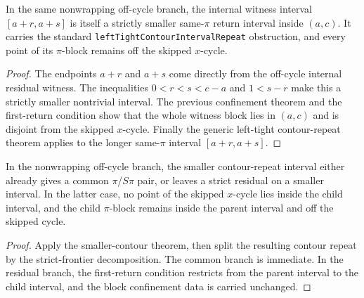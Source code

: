 \begin{theorem}
  \label{thm:off-cycle-smaller-contour-interval}
  \leanok
  In the same nonwrapping off-cycle branch, the internal witness interval
  \([a+r,a+s]\) is itself a strictly smaller same-\(\pi\) return interval
  inside \((a,c)\).  It carries the standard
  \texttt{leftTightContourIntervalRepeat} obstruction, and every point of its
  \(\pi\)-block remains off the skipped \(x\)-cycle.
\end{theorem}

\begin{proof}
  \leanok
  The endpoints \(a+r\) and \(a+s\) come directly from the off-cycle internal
  residual witness.  The inequalities \(0<r<s<c-a\) and \(1<s-r\) make this a
  strictly smaller nontrivial interval.  The previous confinement theorem and
  the first-return condition show that the whole witness block lies in
  \((a,c)\) and is disjoint from the skipped \(x\)-cycle.  Finally the generic
  left-tight contour-repeat theorem applies to the longer same-\(\pi\)
  interval \([a+r,a+s]\).
\end{proof}

\begin{theorem}
  \label{thm:off-cycle-smaller-side-aware-residual}
  \leanok
  In the nonwrapping off-cycle branch, the smaller contour-repeat interval
  either already gives a common \(\pi\)/\(S\pi\) pair, or leaves a strict
  residual on a smaller interval.  In the latter case, no point of the skipped
  \(x\)-cycle lies inside the child interval, and the child \(\pi\)-block
  remains inside the parent interval and off the skipped cycle.
\end{theorem}

\begin{proof}
  \leanok
  Apply the smaller-contour theorem, then split the resulting contour repeat by
  the strict-frontier decomposition.  The common branch is immediate.  In the
  residual branch, the first-return condition restricts from the parent
  interval to the child interval, and the block confinement data is carried
  unchanged.
\end{proof}


